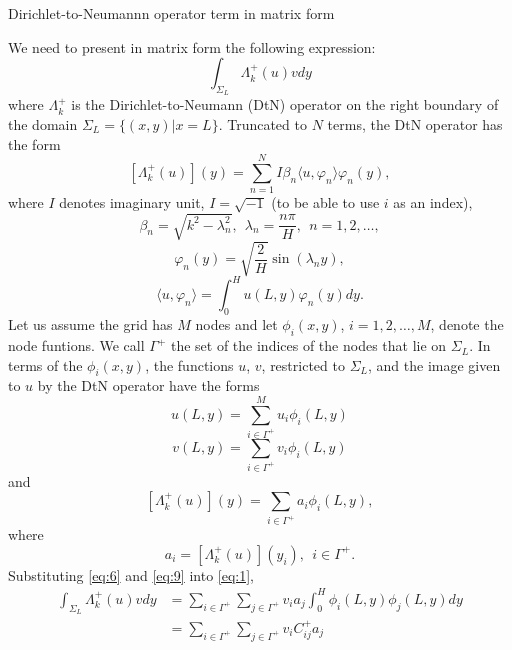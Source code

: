 \documentclass[11pt]{article}
\begin{document}
\begin{center}
{\Large Dirichlet-to-Neumannn operator term in matrix form}
\end{center}
We need to present in matrix form the following expression:
\begin{equation}
  \label{eq:1}
  \int_{\Sigma_L}\Lambda_k^+(u) v dy
\end{equation}
where $\Lambda_k^+$ is the Dirichlet-to-Neumann (DtN) operator on the right boundary of the domain $\Sigma_L = \{(x,y)|x=L\}$. Truncated to $N$ terms, the DtN operator has the form
\begin{equation}
  \label{eq:2}
  [\Lambda_k^+(u)](y) = \sum_{n=1}^N I \beta_n \langle u, \varphi_n \rangle \varphi_n(y),
\end{equation}
where $I$ denotes imaginary unit, $I = \sqrt{-1}$ (to be able to use $i$ as an index),
\begin{equation}
  \label{eq:3}
  \beta_n = \sqrt{k^2 - \lambda_n^2},~~\lambda_n = \frac{n\pi}{H},~~n=1,2,\ldots,
\end{equation}
\begin{equation}
  \label{eq:4}
  \varphi_n(y) = \sqrt{\frac{2}{H}} \sin(\lambda_n y),
\end{equation}
\begin{equation}
  \label{eq:5}
  \langle u, \varphi_n \rangle = \int_0^H u(L,y) \varphi_n(y) dy.
\end{equation}
Let us assume the grid has $M$ nodes and let $\phi_i(x,y)$, $i=1,2, \ldots, M$, denote the node funtions. We call $\Gamma^+$ the set of the indices of the nodes that lie on $\Sigma_L$. In terms of the $\phi_i(x,y)$, the functions $u$, $v$, restricted to $\Sigma_L$, and the image given to $u$ by the DtN operator have the forms
\begin{equation}
  \label{eq:8}
  u(L,y) = \sum_{i \in \Gamma^+}^M u_i\phi_i(L,y)
\end{equation}
\begin{equation}
  \label{eq:9}
  v(L,y) = \sum_{i \in \Gamma^+} v_i\phi_i(L,y)
\end{equation}
and
\begin{equation}
  \label{eq:6}
  [\Lambda_k^+(u)](y) = \sum_{i \in \Gamma^+} a_i \phi_i(L,y),
\end{equation}
where
\begin{equation}
  \label{eq:7}
  a_i = [\Lambda_k^+(u)](y_i),~~i \in \Gamma^+.
\end{equation}
Substituting \eqref{eq:6} and \eqref{eq:9} into \eqref{eq:1},
\begin{align}
  \label{eq:10}
  \int_{\Sigma_L}\Lambda_k^+(u) v dy &=
                                       \sum_{i\in\Gamma^+}\sum_{j\in\Gamma^+}  v_i a_j \int_0^H \phi_i(L,y)\phi_j(L,y)dy \\
  &= \sum_{i\in\Gamma^+}\sum_{j\in\Gamma^+} v_i C_{ij}^+ a_j \label{eq:10b}
\end{align}
\end{document}
